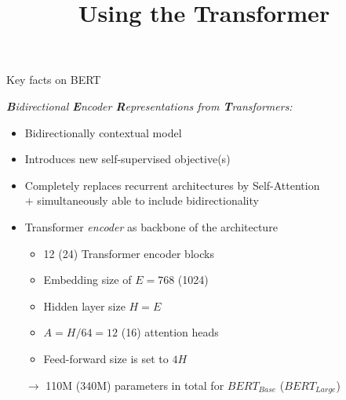 



\newcommand{\titlefigure}{figure/bert.jpeg}
\newcommand{\learninggoals}{
\item Understand the use of the transformer encoder in this model
\item Understand the iarchitectural components}

\title{Using the Transformer}
\date{}




\begin{vbframe}{Key facts on BERT \href{https://arxiv.org/pdf/1810.04805.pdf}{}}

\vfill

\textit{\textbf{B}idirectional \textbf{E}ncoder \textbf{R}epresentations from \textbf{T}ransformers:}
\begin{itemize}
		\item Bidirectionally contextual model
		\item Introduces new self-supervised objective(s)
		\item Completely replaces recurrent architectures by Self-Attention\\$+$ simultaneously able to include bidirectionality
\end{itemize}

	\begin{itemize}
		\item Transformer \textit{encoder} as backbone of the architecture
			\begin{itemize}
				\item 12 (24) Transformer encoder blocks
				\item Embedding size of $E = 768$ (1024)
				\item Hidden layer size $H = E$
				\item $A = H/64 = 12$ (16) attention heads
				\item Feed-forward size is set to $4H$
			\end{itemize}
			$\rightarrow$ 110M (340M) parameters in total for $BERT_{Base}$ ($BERT_{Large}$)
	\end{itemize}

\vfill

\end{vbframe}

